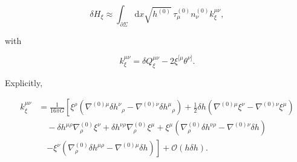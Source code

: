 \[
\delta H_\xi\approx\int_{\partial\Sigma}\mathrm{d}x\sqrt{h^{(0)}}\,\tau^{(0)}_\mu n^{(0)}_\nu k_\xi^{\mu\nu},
\]

with

\[
k_\xi^{\mu\nu}=\delta Q_\xi^{\mu\nu}-2\xi^{[\mu}\theta^{\nu]}.
\]

Explicitly,

\begin{align}
k_\xi^{\mu\nu}&=\frac{1}{16\pi G}\left[\xi^\rho\left(\nabla^{(0)\mu}\delta h^\nu{}_\rho-\nabla^{(0)\nu}\delta h^\mu{}_\rho\right)+\frac{1}{2}\delta h\left(\nabla^{(0)\mu}\xi^\nu-\nabla^{(0)\nu}\xi^\mu\right)\right.\\
&\quad-\delta h^{\mu\rho}\nabla^{(0)}_\rho\xi^\nu+\delta h^{\nu\rho}\nabla^{(0)}_\rho\xi^\mu+\xi^\mu\left(\nabla^{(0)}_\rho\delta h^{\nu\rho}-\nabla^{(0)\nu}\delta h\right)\\
&\quad\left.-\xi^\nu\left(\nabla^{(0)}_\rho\delta h^{\mu\rho}-\nabla^{(0)\mu}\delta h\right)\right]+\mathcal{O}(h\delta h).
\end{align}

